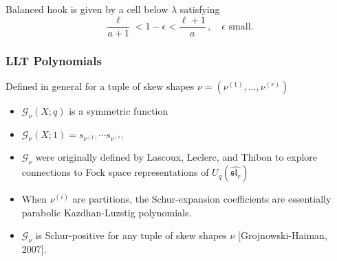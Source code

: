 \documentclass{beamer}
\newcommand{\Gcal}{\mathcal{G}}
\renewcommand{\sl}{\mathfrak{sl}}
\newcounter{c}
\begin{document}
\begin{frame}
\begin{center}
\begin{tikzpicture}[xscale = 0.4,yscale = 0.4]
\end{tikzpicture}
\end{center} \pause
Balanced hook is given by a cell below \(\lambda\) satisfying \[
  \frac{\ell}{a+1} < 1-\epsilon < \frac{\ell+1}{a}\,,\quad \epsilon
  \text{ small}.
\]
\end{frame}
\begin{frame}
  \frametitle{LLT Polynomials}
  Defined in general for a tuple of skew shapes \(\nu = (\nu^{(1)},\ldots,\nu^{(r)})\)\pause
  \begin{itemize}
  \item \(\Gcal_\nu(X;q)\) is a symmetric function\pause
  \item \(\Gcal_\nu(X;1) = s_{\nu^{(1)}} \cdots s_{\nu^{(r)}}\)\pause
  \item \(\Gcal_\nu\) were originally defined by Lascoux, Leclerc, and
    Thibon to explore connections to Fock space representations of \(U_q(\hat{\sl_r})\)\pause
  \item When \(\nu^{(i)}\) are partitions, the Schur-expansion
    coefficients are essentially parabolic Kazdhan-Luzstig polynomials.\pause
  \item \(\Gcal_\nu\) is Schur-positive for any tuple of skew shapes \(\nu\)
    [Grojnowski-Haiman, 2007].
  \end{itemize}
\end{frame}
\end{document}
